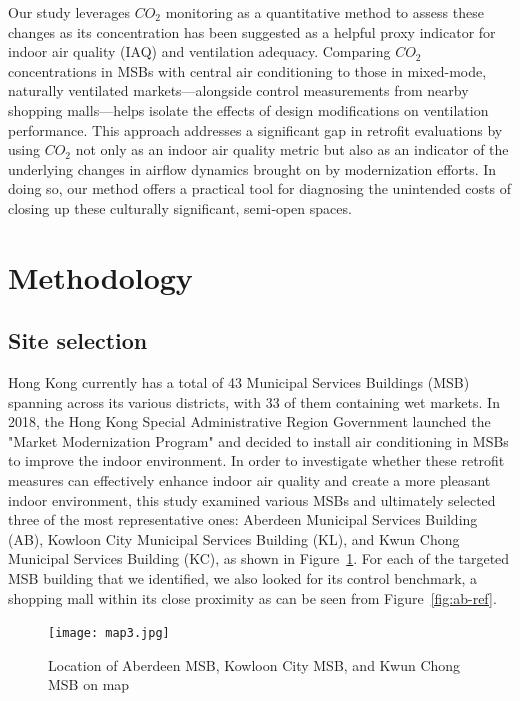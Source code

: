 \documentclass[preprint,12pt]{elsarticle}
\begin{document}
    Our study leverages $CO_2$ monitoring as a quantitative method to assess these changes as its concentration has been suggested as a helpful proxy indicator for indoor air quality (IAQ) and ventilation adequacy\cite{persily1997co2}.
    Comparing $CO_2$ concentrations in MSBs with central air conditioning to those in mixed-mode, naturally ventilated markets—alongside control measurements from nearby shopping malls—helps isolate the effects of design modifications on ventilation performance. This approach addresses a significant gap in retrofit evaluations by using $CO_2$ not only as an indoor air quality metric but also as an indicator of the underlying changes in airflow dynamics brought on by modernization efforts\cite{15,17}. In doing so, our method offers a practical tool for diagnosing the unintended costs of closing up these culturally significant, semi‑open spaces.

\section{Methodology}
\label{sec:sample1}
\subsection{Site selection}

Hong Kong currently has a total of 43 Municipal Services Buildings (MSB) spanning across its various districts, with 33 of them containing wet markets. In 2018, the Hong Kong Special Administrative Region Government launched the "Market Modernization Program" and decided to install air conditioning in MSBs to improve the indoor environment\cite{19}. In order to investigate whether these retrofit measures can effectively enhance indoor air quality and create a more pleasant indoor environment, this study examined various MSBs and ultimately selected three of the most representative ones: Aberdeen Municipal Services Building (AB), Kowloon City Municipal Services Building (KL), and Kwun Chong Municipal Services Building (KC), as shown in Figure~\ref{fig:ab,kl,kc}. For each of the targeted MSB building that we identified, we also looked for its control benchmark, a shopping mall within its close proximity as can be seen from Figure~\ref{fig:ab-ref}.

\begin{figure}[h]
    \centering
    \texttt{[image: map3.jpg]}
    \caption{Location of Aberdeen MSB, Kowloon City MSB, and Kwun Chong MSB on map}
    \label{fig:ab,kl,kc}
\end{figure}
\end{document}
